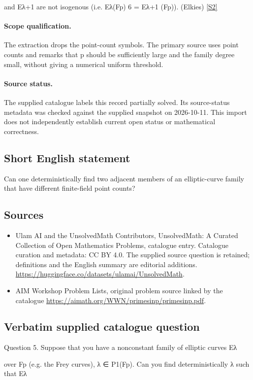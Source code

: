 \documentclass[11pt]{article}
\begin{document}
and Eλ+1 are not isogenous (i.e. Eλ(Fp) 6 = Eλ+1 (Fp)). (Elkies) \href{https://aimath.org/WWN/primesinp/primesinp.pdf}{[S2]}
\paragraph{Scope qualification.}
The extraction drops the point-count symbols. The primary source uses point counts and remarks that p should be sufficiently large and the family degree small, without giving a numerical uniform threshold.
\paragraph{Source status.}
The supplied catalogue labels this record partially solved. Its source-status metadata was checked against the supplied snapshot on 2026-10-11. This import does not independently establish current open status or mathematical correctness.
\subsection{Short English statement}
Can one deterministically find two adjacent members of an elliptic-curve family that have different finite-field point counts?
\subsection{Sources}
\begin{itemize}
\item[S1] Ulam AI and the UnsolvedMath Contributors, UnsolvedMath: A Curated Collection of Open Mathematics Problems, catalogue entry. Catalogue curation and metadata: CC BY 4.0. The supplied source question is retained; definitions and the English summary are editorial additions.
\url{https://huggingface.co/datasets/ulamai/UnsolvedMath}.
\item[S2] AIM Workshop Problem Lists, original problem source linked by the catalogue
\url{https://aimath.org/WWN/primesinp/primesinp.pdf}.
\end{itemize}
\subsection{Verbatim supplied catalogue question}
Question 5. Suppose that you have a nonconstant family of elliptic curves Eλ

over Fp (e.g. the Frey curves), λ ∈ P1(Fp). Can you find deterministically λ such that Eλ
\end{document}
